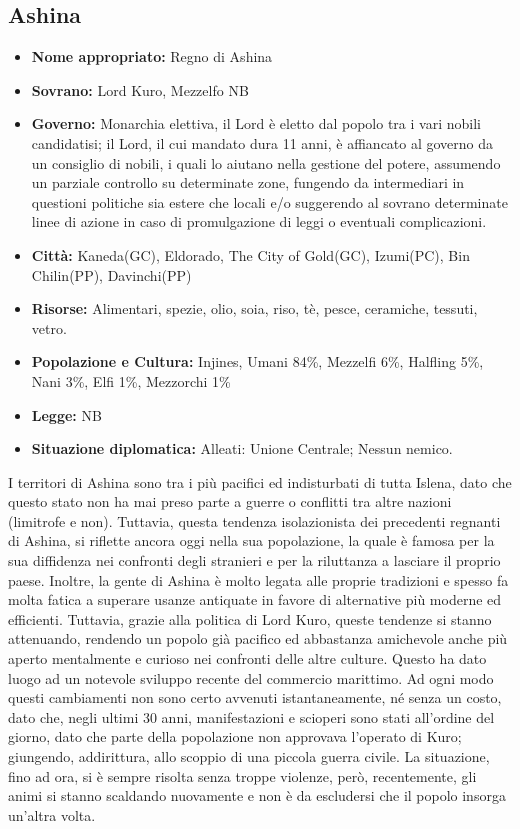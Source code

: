 \documentclass[10pt, a4paper]{report}
\begin{document}
\begin{multicols}{2}
\subsection*{Ashina}
\begin{itemize}
	\item \textbf{Nome appropriato:} Regno di Ashina
	\item \textbf{Sovrano:} Lord Kuro, Mezzelfo NB
	\item \textbf{Governo:} Monarchia elettiva, il Lord è eletto dal popolo tra i vari nobili candidatisi; il Lord, il cui mandato dura 11 anni, è affiancato al governo da un consiglio di nobili, i quali lo aiutano nella gestione del potere, assumendo un parziale controllo su determinate zone, fungendo da intermediari in questioni politiche sia estere che locali e/o suggerendo al sovrano determinate linee di azione in caso di promulgazione di leggi o eventuali complicazioni.
	\item \textbf{Città:} Kaneda(GC), Eldorado, The City of Gold(GC), Izumi(PC), Bin Chilin(PP), Davinchi(PP)
	\item \textbf{Risorse:} Alimentari, spezie, olio, soia, riso, tè, pesce, ceramiche, tessuti, vetro. 
	\item \textbf{Popolazione e Cultura:} Injines, Umani 84\%, Mezzelfi 6\%, Halfling 5\%, Nani 3\%, Elfi 1\%, Mezzorchi 1\%
	\item \textbf{Legge:} NB
	\item \textbf{Situazione diplomatica:} Alleati: Unione Centrale; Nessun nemico.
\end{itemize}
I territori di Ashina sono tra i più pacifici ed indisturbati di tutta Islena, dato che questo stato non ha mai preso parte a guerre o conflitti tra altre nazioni (limitrofe e non). Tuttavia, questa tendenza isolazionista dei precedenti regnanti di Ashina, si riflette ancora oggi nella sua popolazione, la quale è famosa per la sua diffidenza nei confronti degli stranieri e per la riluttanza a lasciare il proprio paese. Inoltre, la gente di Ashina è molto legata alle proprie tradizioni e spesso fa molta fatica a superare usanze antiquate in favore di alternative più moderne ed efficienti. Tuttavia, grazie alla politica di Lord Kuro, queste tendenze si stanno attenuando, rendendo un popolo già pacifico ed abbastanza amichevole anche più aperto mentalmente e curioso nei confronti delle altre culture. Questo ha dato luogo ad un notevole sviluppo recente del commercio marittimo. Ad ogni modo questi cambiamenti non sono certo avvenuti istantaneamente, né senza un costo, dato che, negli ultimi 30 anni, manifestazioni e scioperi sono stati all’ordine del giorno, dato che parte della popolazione non approvava l’operato di Kuro; giungendo, addirittura, allo scoppio di una piccola guerra civile. La situazione, fino ad ora, si è sempre risolta senza troppe violenze, però, recentemente, gli animi si stanno scaldando nuovamente e non è da escludersi che il popolo insorga un’altra volta.


\end{multicols}
\end{document}

